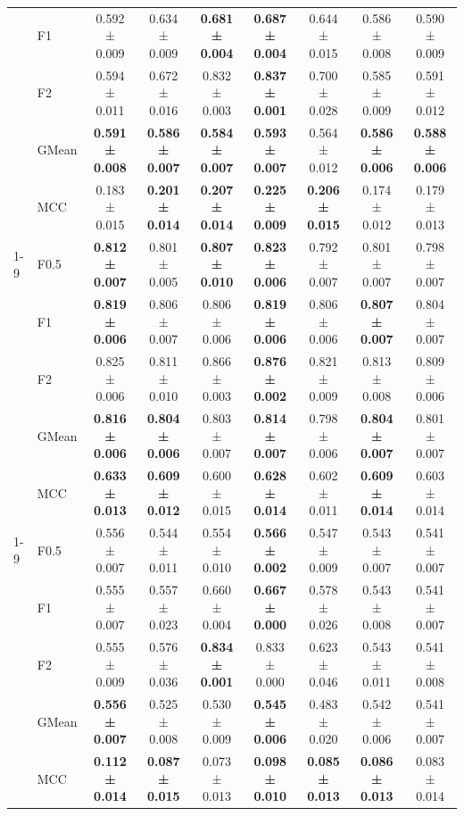 \begin{table}[H]
{\begin{tabular}{llccccccc}
 & F1 & 0.592 ± 0.009 & 0.634 ± 0.009 & \textbf{0.681 ± 0.004} & \textbf{0.687 ± 0.004} & 0.644 ± 0.015 & 0.586 ± 0.008 & 0.590 ± 0.009 \\
 & F2 & 0.594 ± 0.011 & 0.672 ± 0.016 & 0.832 ± 0.003 & \textbf{0.837 ± 0.001} & 0.700 ± 0.028 & 0.585 ± 0.009 & 0.591 ± 0.012 \\
 & GMean & \textbf{0.591 ± 0.008} & \textbf{0.586 ± 0.007} & \textbf{0.584 ± 0.007} & \textbf{0.593 ± 0.007} & 0.564 ± 0.012 & \textbf{0.586 ± 0.006} & \textbf{0.588 ± 0.006} \\
 & MCC & 0.183 ± 0.015 & \textbf{0.201 ± 0.014} & \textbf{0.207 ± 0.014} & \textbf{0.225 ± 0.009} & \textbf{0.206 ± 0.015} & 0.174 ± 0.012 & 0.179 ± 0.013 \\
\cline{1-9}
\multirow[t]{5}{*}{LGBM()} & F0.5 & \textbf{0.812 ± 0.007} & 0.801 ± 0.005 & \textbf{0.807 ± 0.010} & \textbf{0.823 ± 0.006} & 0.792 ± 0.007 & 0.801 ± 0.007 & 0.798 ± 0.007 \\
 & F1 & \textbf{0.819 ± 0.006} & 0.806 ± 0.007 & 0.806 ± 0.006 & \textbf{0.819 ± 0.006} & 0.806 ± 0.006 & \textbf{0.807 ± 0.007} & 0.804 ± 0.007 \\
 & F2 & 0.825 ± 0.006 & 0.811 ± 0.010 & 0.866 ± 0.003 & \textbf{0.876 ± 0.002} & 0.821 ± 0.009 & 0.813 ± 0.008 & 0.809 ± 0.006 \\
 & GMean & \textbf{0.816 ± 0.006} & \textbf{0.804 ± 0.006} & 0.803 ± 0.007 & \textbf{0.814 ± 0.007} & 0.798 ± 0.006 & \textbf{0.804 ± 0.007} & 0.801 ± 0.007 \\
 & MCC & \textbf{0.633 ± 0.013} & \textbf{0.609 ± 0.012} & 0.600 ± 0.015 & \textbf{0.628 ± 0.014} & 0.602 ± 0.011 & \textbf{0.609 ± 0.014} & 0.603 ± 0.014 \\
\cline{1-9}
\multirow[t]{5}{*}{LogisticRegression()} & F0.5 & 0.556 ± 0.007 & 0.544 ± 0.011 & 0.554 ± 0.010 & \textbf{0.566 ± 0.002} & 0.547 ± 0.009 & 0.543 ± 0.007 & 0.541 ± 0.007 \\
 & F1 & 0.555 ± 0.007 & 0.557 ± 0.023 & 0.660 ± 0.004 & \textbf{0.667 ± 0.000} & 0.578 ± 0.026 & 0.543 ± 0.008 & 0.541 ± 0.007 \\
 & F2 & 0.555 ± 0.009 & 0.576 ± 0.036 & \textbf{0.834 ± 0.001} & 0.833 ± 0.000 & 0.623 ± 0.046 & 0.543 ± 0.011 & 0.541 ± 0.008 \\
 & GMean & \textbf{0.556 ± 0.007} & 0.525 ± 0.008 & 0.530 ± 0.009 & \textbf{0.545 ± 0.006} & 0.483 ± 0.020 & 0.542 ± 0.006 & 0.541 ± 0.007 \\
 & MCC & \textbf{0.112 ± 0.014} & \textbf{0.087 ± 0.015} & 0.073 ± 0.013 & \textbf{0.098 ± 0.010} & \textbf{0.085 ± 0.013} & \textbf{0.086 ± 0.013} & 0.083 ± 0.014 \\

\end{tabular}}
\end{table}
